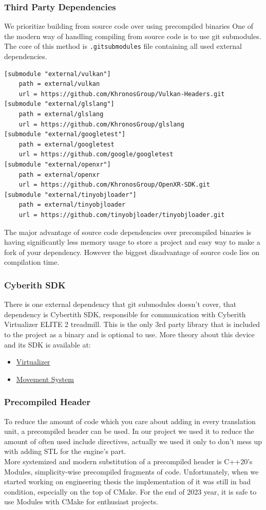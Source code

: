 \subsubsection{Third Party Dependencies}
\label{lst:3rdparty}
We prioritize building from source code over using precompiled binaries
One of the modern way of handling compiling from source code is to use git submodules. The core of this method is \texttt{.gitsubmodules} file containing all used external dependencies.
\begin{lstlisting}[caption=.gitsubmodules]
[submodule "external/vulkan"]
	path = external/vulkan
	url = https://github.com/KhronosGroup/Vulkan-Headers.git
[submodule "external/glslang"]
	path = external/glslang
	url = https://github.com/KhronosGroup/glslang
[submodule "external/googletest"]
	path = external/googletest
	url = https://github.com/google/googletest
[submodule "external/openxr"]
	path = external/openxr
	url = https://github.com/KhronosGroup/OpenXR-SDK.git
[submodule "external/tinyobjloader"]
	path = external/tinyobjloader
	url = https://github.com/tinyobjloader/tinyobjloader.git
\end{lstlisting}
The major advantage of source code dependencies over precompiled binaries is having significantly less memory usage to store a project and easy way to make a fork of your dependency. However the biggest disadvantage of source code lies on compilation time.

\subsubsection{Cyberith SDK}
There is one external dependency that git submodules doesn't cover, that dependency is Cybertith SDK, responsible for communication with Cyberith Virtualizer ELITE 2 treadmill.
This is the only 3rd party library that is included to the project as a binary and is optional to use.
More theory about this device and its SDK is available at:
\begin{itemize}
    \item \hyperref[]{Virtualizer} %
    \item \hyperref[sec:movement_system]{Movement System}
\end{itemize}

\subsubsection{Precompiled Header}
To reduce the amount of code which you care about adding in every translation unit, a precompiled header can be used. In our project we used it to reduce the amount of often used include directives, actually we used it only to don't mess up with adding STL for the engine's part.\\
More systemized and modern substitution of a precompiled header is C++20's Modules, simplicity-wise precompiled fragments of code. Unfortunately, when we started working on engineering thesis the implementation of it was still in bad condition, especially on the top of CMake. For the end of 2023 year, it is safe to use Modules with CMake for enthusiast projects.

